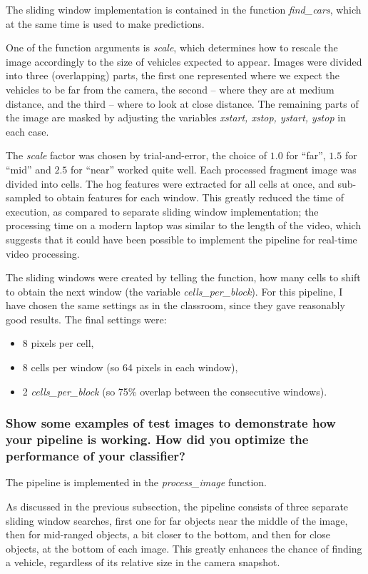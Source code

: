 \documentclass[a4paper,10pt]{article}
\begin{document}
The sliding window implementation is contained in the function \emph{find\_cars},
which at the same time is used to make predictions.

One of the function arguments is \emph{scale}, which determines how to rescale 
the image accordingly to the size of vehicles expected to appear.
Images were divided into three (overlapping) parts, the first one represented where we expect the vehicles to be far from the camera,
the second -- where they are at medium distance, and the third -- where to look at close distance.
The remaining parts of the image are masked by adjusting the variables \emph{xstart, xstop, ystart, ystop} in each case.

The \emph{scale} factor was chosen by trial-and-error, the choice of $1.0$ for ``far'', $1.5$ for ``mid'' and $2.5$ for ``near'' worked quite well.
Each processed fragment image was divided into cells.
The hog features were extracted for all cells at once, and sub-sampled to obtain features for each window.
This greatly reduced the time of execution, as compared to separate sliding window implementation; the processing time on a modern laptop was similar to the length of the video,
which suggests that it could have been possible to implement the pipeline for real-time video processing.

The sliding windows were created by telling the function, how many cells to shift to obtain the next window (the variable \emph{cells\_per\_block}).
For this pipeline, I have chosen the same settings as in the classroom, since they gave reasonably good results.
The final settings were:
%
\begin{itemize}
  \item 8 pixels per cell,
  \item 8 cells per window (so 64 pixels in each window),
  \item 2 \emph{cells\_per\_block} (so 75\% overlap between the consecutive windows).
\end{itemize}

\subsubsection{Show some examples of test images to demonstrate how your pipeline is working. How did you optimize the performance of your classifier?}\label{subsection}

The pipeline is implemented in the \emph{process\_image} function.

As discussed in the previous subsection, the pipeline consists of three separate sliding window searches,
first one for far objects near the middle of the image, then for mid-ranged objects, a bit closer to the bottom,
and then for close objects, at the bottom of each image. This greatly enhances the chance of finding a vehicle,
regardless of its relative size in the camera snapshot.
\end{document}
